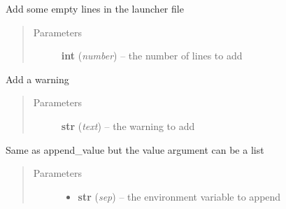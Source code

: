 \documentclass[a4paper,10pt,english]{sphinxmanual}
\begin{document}
\begin{fulllineitems}
\begin{fulllineitems}
\end{fulllineitems}


\begin{fulllineitems}
\label{commands/apidoc/src:src.fileEnviron.LauncherFileEnviron.add_line}
Add some empty lines in the launcher file
\begin{quote}\begin{description}
\item[{Parameters}] \leavevmode
\textbf{int} (\emph{number}) -- the number of lines to add

\end{description}\end{quote}

\end{fulllineitems}


\begin{fulllineitems}
\label{commands/apidoc/src:src.fileEnviron.LauncherFileEnviron.add_warning}
Add a warning
\begin{quote}\begin{description}
\item[{Parameters}] \leavevmode
\textbf{str} (\emph{text}) -- the warning to add

\end{description}\end{quote}

\end{fulllineitems}


\begin{fulllineitems}
\label{commands/apidoc/src:src.fileEnviron.LauncherFileEnviron.append}
Same as append\_value but the value argument can be a list
\begin{quote}\begin{description}
\item[{Parameters}] \leavevmode\begin{itemize}
\item {} 
\textbf{str} (\emph{sep}) -- the environment variable to append


\end{itemize}
\end{description}
\end{quote}
\end{fulllineitems}
\end{fulllineitems}
\end{document}
